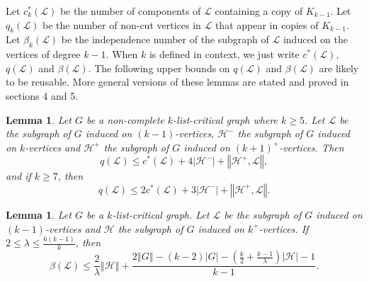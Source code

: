 \documentclass[10pt]{article}
\theoremstyle{plain}
\newtheorem{lem}[thm]{Lemma}
\theoremstyle{definition}
\theoremstyle{remark}
\newcommand{\fancy}[1]{\mathcal{#1}}
\renewcommand{\L}{\fancy{L}}
\newcommand{\HH}{\fancy{H}}
\newcommand{\card}[1]{\left|#1\right|}
\newcommand{\size}[1]{\left\Vert#1\right\Vert}
\newcommand{\parens}[1]{\left( #1 \right)}
\begin{document}
Let $c_k^*(\L)$ be the number of components of $\L$ containing a copy of $K_{k-1}$. Let $q_k(\L)$ be the number of non-cut vertices in $\L$ that appear in copies of $K_{k-1}$.  
Let $\beta_k(\L)$ be the independence number of the subgraph of $\L$ induced on the vertices of degree $k-1$.  
When $k$ is defined in context, we just write $c^*(\L)$, $q(\L)$ and $\beta(\L)$.  
The following upper bounds on $q(\L)$ and $\beta(\L)$ are likely to be reusable.  More general versions of these lemmas are stated and proved in sections 4 and 5.

\begin{lem}\label{qLemmaList}
	Let $G$ be a non-complete $k$-list-critical graph where $k \ge 5$.  Let $\L$ be the subgraph of $G$ induced on $(k-1)$-vertices, $\HH^-$ the subgraph of $G$ induced on $k$-vertices
	and $\HH^+$ the subgraph of $G$ induced on $(k+1)^+$-vertices.  Then
	\[q(\L) \le c^*(\L) + 4\card{\HH^-} + \size{\HH^+, \L},\] and if $k \ge 7$, then
	\[q(\L) \le 2c^*(\L) + 3\card{\HH^-} + \size{\HH^+, \L}.\]
\end{lem}

\begin{lem}\label{betaLemmaList}
	Let $G$ be a $k$-list-critical graph.  Let $\L$ be the subgraph of $G$ induced on $(k-1)$-vertices and	$\HH$ the subgraph of $G$ induced on $k^+$-vertices.  
	If $2 \le \lambda \le \frac{6(k-1)}{k}$, then
	\[\beta(\L) \le \frac{2}{\lambda}\size{\HH} + \frac{2\size{G} - (k-2)\card{G} - \parens{\frac{k}{2} + \frac{k-1}{\lambda}}\card{\HH} - 1}{k-1}.\]
\end{lem}
\end{document}
